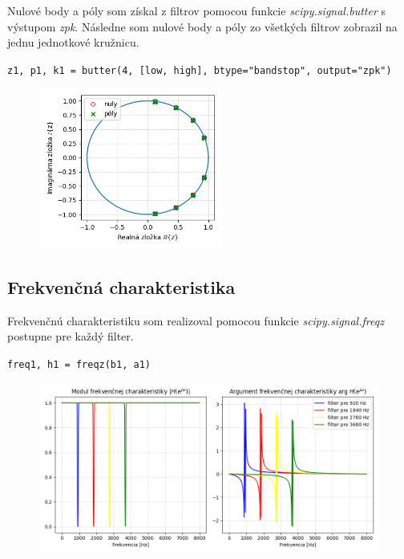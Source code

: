\documentclass[a4paper,oneside]{article}
\begin{document}
	Nulové body a póly som získal z filtrov pomocou funkcie \textit{scipy.signal.butter} s výstupom \textit{zpk}. Následne som nulové body a póly zo všetkých filtrov zobrazil na jednu jednotkové kružnicu.
	
	\begin{center}
	        \verb|z1, p1, k1 = butter(4, [low, high], btype="bandstop", output="zpk")|
    \end{center}
	
	\begin{figure}[h]
	    \begin{center}
		    \includegraphics[width=6cm,keepaspectratio]{uloha4-8.png}
		\end{center}
	\end{figure}
	
	
	\subsection{Frekvenčná charakteristika}
	
	Frekvenčnú charakteristiku som realizoval pomocou funkcie \textit{scipy.signal.freqz} postupne pre každý filter.
	
	\begin{center}
	        \verb|freq1, h1 = freqz(b1, a1)|
    \end{center}
	
	\begin{figure}[h]
	    \begin{center}
		    \includegraphics[width=12cm,keepaspectratio]{uloha4-9.png}
		\end{center}
	\end{figure}
	
\end{document}
